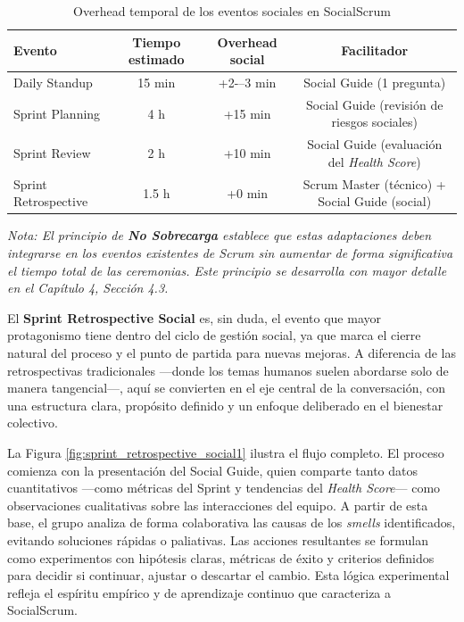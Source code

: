 \begin{table}[h]
    \centering
    \small
    \begin{tabular}{|l|c|c|c|}
        \hline
        \textbf{Evento}      & \textbf{Tiempo estimado} & \textbf{Overhead social} & \textbf{Facilitador}                                \\
        \hline
        Daily Standup        & 15 min                   & +2-–3 min                & Social Guide (1 pregunta)                           \\
        Sprint Planning      & 4 h                      & +15 min                  & Social Guide (revisión de riesgos sociales)         \\
        Sprint Review        & 2 h                      & +10 min                  & Social Guide (evaluación del \textit{Health Score}) \\
        Sprint Retrospective & 1.5 h                    & +0 min                   & Scrum Master (técnico) + Social Guide (social)      \\
        \hline
    \end{tabular}
    \caption{Overhead temporal de los eventos sociales en SocialScrum}
    \label{tab:eventos-tiempo}
\end{table}

\emph{Nota: El principio de \textbf{No Sobrecarga} establece que estas adaptaciones deben integrarse en los eventos existentes de Scrum sin aumentar de forma significativa el tiempo total de las ceremonias. Este principio se desarrolla con mayor detalle en el Capítulo 4, Sección 4.3.}

\FloatBarrier

El \textbf{Sprint Retrospective Social} es, sin duda, el evento que mayor protagonismo tiene dentro del ciclo de gestión social, ya que marca el cierre natural del proceso y el punto de partida para nuevas mejoras. A diferencia de las retrospectivas tradicionales —donde los temas humanos suelen abordarse solo de manera tangencial—, aquí se convierten en el eje central de la conversación, con una estructura clara, propósito definido y un enfoque deliberado en el bienestar colectivo.

La Figura \ref{fig:sprint_retrospective_social1} ilustra el flujo completo. El proceso comienza con la presentación del Social Guide, quien comparte tanto datos cuantitativos —como métricas del Sprint y tendencias del \textit{Health Score}— como observaciones cualitativas sobre las interacciones del equipo. A partir de esta base, el grupo analiza de forma colaborativa las causas de los \textit{smells} identificados, evitando soluciones rápidas o paliativas.
Las acciones resultantes se formulan como experimentos con hipótesis claras, métricas de éxito y criterios definidos para decidir si continuar, ajustar o descartar el cambio. Esta lógica experimental refleja el espíritu empírico y de aprendizaje continuo que caracteriza a SocialScrum.

